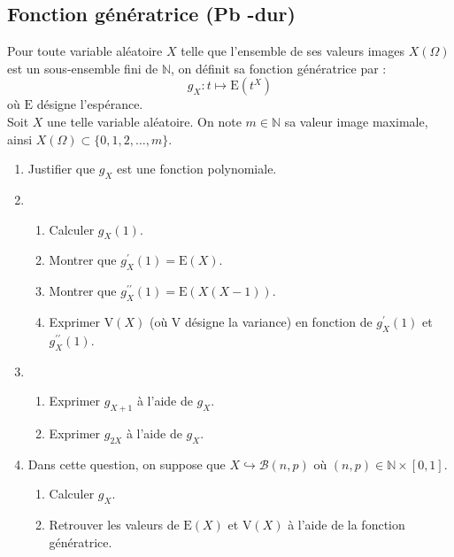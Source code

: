 \subsection{Fonction génératrice (Pb -dur)}

\begin{exercice}%
Pour toute variable aléatoire $X$ telle que l'ensemble de ses valeurs images $X(\Omega)$ est un sous-ensemble fini de $\mathbb{N}$, on définit sa fonction génératrice par :
$$g_{X}: t \mapsto \mathrm{E}\left(t^{X}\right) $$ où $\mathrm{E}$ désigne l'espérance.\\
Soit $X$ une telle variable aléatoire. On note $m \in \mathbb{N}$ sa valeur image maximale, ainsi $X(\Omega) \subset\{0,1,2, \ldots, m\}$.

\begin{enumerate}
  \item Justifier que $g_{X}$ est une fonction polynomiale.
  \item 
 \begin{enumerate}
\item   Calculer $g_{X}(1)$.
\item Montrer que $g_{X}^{\prime}(1)=\mathrm{E}(X)$.
\item  Montrer que $g_{X}^{\prime \prime}(1)=\mathrm{E}(X(X-1))$.
\item  Exprimer $\mathrm{V}(X)$ (où $\mathrm{V}$ désigne la variance) en fonction de $g_{X}^{\prime}(1)$ et $g_{X}^{\prime \prime}(1)$. 
\end{enumerate}  

  \item
  
 \begin{enumerate}
  \item  Exprimer $g_{X+1}$ à l'aide de $g_{X}$.
\item  Exprimer $g_{2 X}$ à l'aide de $g_{X}$.
\end{enumerate}  
  \item Dans cette question, on suppose que $X \hookrightarrow \mathcal{B}(n, p)$ où $(n, p) \in \mathbb{N} \times[0,1]$.
  
  \begin{enumerate}
\item  Calculer $g_{X}$.
\item  Retrouver les valeurs de $\mathrm{E}(X)$ et $\mathrm{V}(X)$ à l'aide de la fonction   génératrice.
  \end{enumerate}

\end{enumerate}
\end{exercice}

